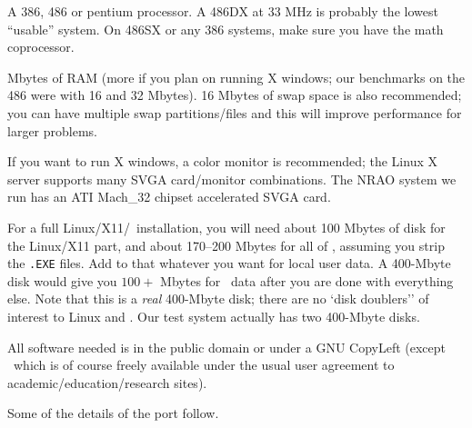 \begin{description}

\bulitem A 386, 486 or pentium processor.  A 486DX at 33 MHz
        is probably the lowest ``usable'' system.  On 486SX or any 386
	systems, make sure you have the math coprocessor.

 Mbytes of RAM (more if you plan on running X windows;
        our benchmarks on the 486 were with 16 and 32 Mbytes).  16
        Mbytes of swap space is also recommended; you can have
        multiple swap partitions/files and this will improve
        performance for larger problems.

\bulitem If you want to run X windows, a color monitor is recommended;
        the Linux X server supports many SVGA card/monitor
        combinations.  The NRAO system we run has an ATI Mach\_32
        chipset accelerated SVGA card.

\bulitem For a full Linux/X11/\AIPS\ installation, you will need about
        100 Mbytes of disk for the Linux/X11 part, and about
        170--200 Mbytes for all of \AIPS, assuming you strip the
        {\tt *.EXE} files.  Add to that whatever you want for local
        user data.  A 400-Mbyte disk would give you $100+$
        Mbytes for \AIPS\ data after you are done with everything
        else.  Note that this is a {\it real} 400-Mbyte disk; there
        are no `disk doublers'' of interest to Linux and \AIPS.  Our
        test system actually has two 400-Mbyte disks.

\bulitem All software needed is in the public domain or under a GNU
	CopyLeft (except \AIPS\ which is of course freely available
	under the usual user agreement to academic/education/research
	sites).

\end{description}

Some of the details of the port follow.

